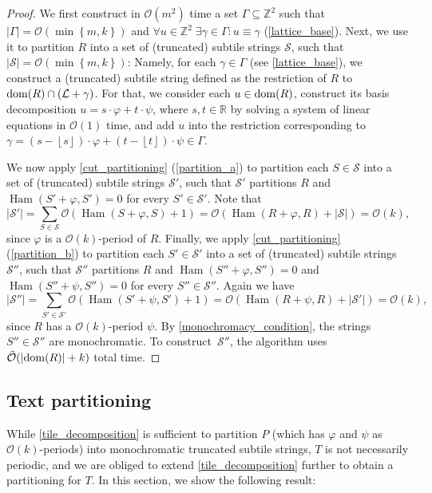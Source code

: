\documentclass[twoside,leqno]{article}
\let\Cref\cref
\newcommand{\R}{\mathbb{R}}
\newcommand{\Z}{\mathbb{Z}}
\renewcommand{\O}{\mathcal{O}}
\newcommand{\tO}{\tilde{\mathcal{O}}}
\renewcommand{\S}{\mathcal{S}}
\renewcommand{\L}{\mathcal{L}}
\renewcommand{\phi}{\varphi}
\newcommand{\floor}[1]{\left\lfloor #1 \right\rfloor}
\newcommand{\set}[1]{\left\lbrace #1 \right\rbrace}
\DeclareMathOperator*{\Ham}{Ham}
\newcommand{\absolute}[1]{\left\lvert#1\right\rvert}
\begin{document}
\restateThmTileDecomposition
\begin{proof}
We first construct in $\O(m^2)$ time a set $\Gamma \subseteq \Z^2$ such that $\absolute{\Gamma} = \O(\min\set{m, k})$ and $\forall u \in \Z^2 \; \exists \gamma \in \Gamma : u \equiv \gamma$ (\Cref{lattice_base}). Next, we use it to partition $R$ into a set of (truncated) subtile strings $\S$, such that $\absolute{\S} = \O(\min\set{m, k})$: Namely, for each $\gamma \in \Gamma$ (see \Cref{lattice_base}), we construct a (truncated) subtile string defined as the restriction of $R$ to $\d{R} \cap (\L + \gamma)$. For that, we consider each $u \in \operatorname*{dom}(R)$, construct its basis decomposition $u = s\cdot \phi + t\cdot \psi$, where $s,t\in \R$ by solving a system of linear equations in $\O(1)$ time, and add $u$ into the restriction corresponding to $\gamma = (s-\floor{s}) \cdot \phi + (t-\floor{t}) \cdot \psi \in \Gamma$. 

	We now apply \Cref{cut_partitioning} (\ref{partition_a}) to partition each $S \in \S$  into a set of (truncated) subtile strings $\S'$, such that $\S'$ partitions $R$ and $\Ham(S' + \phi, S') = 0$ for every $S' \in \S'$.
	Note that
	\[ \absolute{\S'} = \sum_{S \in \S} \O(\Ham(S + \phi, S) + 1) = \O(\Ham(R + \phi, R) + \absolute{\S}) = \O(k),\]
	since $\phi$ is a $\O(k)$-period of $R$.
	Finally, we apply  \Cref{cut_partitioning} (\ref{partition_b}) to partition each $S' \in \S'$ into a set of (truncated) subtile strings $\S''$, such that $\S''$ partitions $R$ and $\Ham(S'' + \phi, S'') = 0$ and $\Ham(S'' + \psi, S'') = 0$ for every $S'' \in \S''$.
	Again we have
	\[ \absolute{\S''} = \sum_{S' \in \S'} \O(\Ham(S' + \psi, S') + 1) = \O(\Ham(R + \psi, R) + \absolute{\S'}) = \O(k),\]
	since $R$ has a $\O(k)$-period $\psi$.
	By \Cref{monochromacy_condition}, the strings $S'' \in \S''$ are monochromatic.
	To construct~$\S''$, the algorithm uses $\tO(\absolute{\d{R}} + k)$ total time.
\end{proof}


\subsection{Text partitioning}
While \cref{tile_decomposition} is sufficient to partition $P$ (which has $\phi$ and $\psi$ as $\O(k)$-periods) into monochromatic truncated subtile strings, $T$ is not necessarily periodic, and we are obliged to extend \cref{tile_decomposition} further to obtain a partitioning for $T$. In this section, we show the following result:
\end{document}
